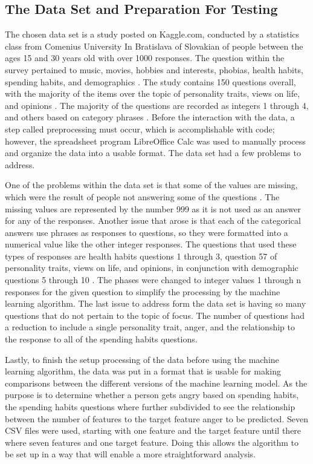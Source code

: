 \documentclass[a4paper, 12pt]{article}
\begin{document}
\subsection{The Data Set and Preparation For Testing}
\begin{paragraph}
\indent The chosen data set is a study posted on Kaggle.com, conducted by a statistics class from Comenius University In Bratislava of Slovakian of people between the ages 15 and 30 years old with over 1000 responses\cite{DataSet}. The question within the survey pertained to music, movies, hobbies and interests, phobias, health habits, spending habits, and demographics \cite{DataSet}. The study contains 150 questions overall, with the majority of the items over the topic of personality traits, views on life, and opinions \cite{DataSet}. The majority of the questions are recorded as integers 1 through 4, and others based on category phrases \cite{DataSet}. Before the interaction with the data, a step called preprocessing must occur, which is accomplishable with code; however, the spreadsheet program LibreOffice Calc was used to manually process and organize the data into a usable format. The data set had a few problems to address.
\par
\indent One of the problems within the data set is that some of the values are missing, which were the result of people not answering some of the questions \cite{DataSet}. The missing values are represented by the number 999 as it is not used as an answer for any of the responses. Another issue that arose is that each of the categorical answers use phrases as responses to questions, so they were formatted into a numerical value like the other integer responses. The questions that used these types of responses are health habits questions 1 through 3, question 57 of personality traits, views on life, and opinions, in conjunction with demographic questions 5 through 10 \cite{DataSet}. The phases were changed to integer values 1 through n responses for the given question to simplify the processing by the machine learning algorithm. The last issue to address form the data set is having so many questions that do not pertain to the topic of focus. The number of questions had a reduction to include a single personality trait, anger, and the relationship to the response to all of the spending habits questions.
\par
\indent Lastly, to finish the setup processing of the data before using the machine learning algorithm, the data was put in a format that is usable for making comparisons between the different versions of the machine learning model. As the purpose is to determine whether a person gets angry based on spending habits, the spending habits questions where further subdivided to see the relationship between the number of features to the target feature anger to be predicted. Seven CSV files were used, starting with one feature and the target feature until there where seven features and one target feature. Doing this allows the algorithm to be set up in a way that will enable a more straightforward analysis.
\end{paragraph}
\end{document}
